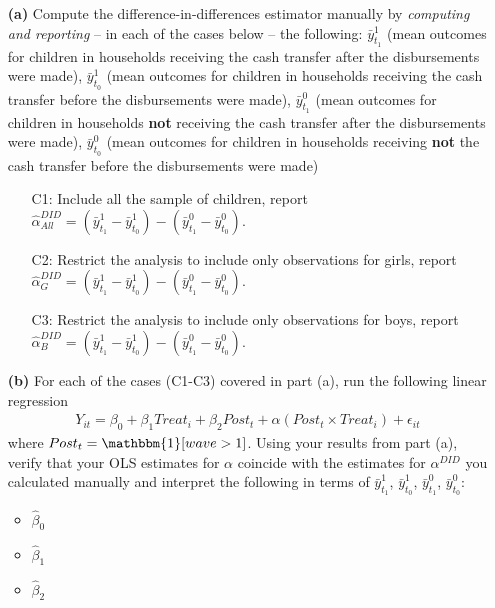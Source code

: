 \documentclass[12pt]{article} %
\begin{document}
\begin{itemize}
	\item[\textbf{(a)}]  Compute the difference-in-differences estimator manually by \textit{computing and reporting} -- in each of the cases below -- the following: $\bar{y}_{t_1}^1$ (mean outcomes for children in households receiving the cash transfer after the disbursements were made),  $\bar{y}_{t_0}^1$ (mean outcomes for children in households receiving the cash transfer before the disbursements were made),  $\bar{y}_{t_1}^0$ (mean outcomes for children in households \textbf{not} receiving the cash transfer after the disbursements were made),  $\bar{y}_{t_0}^0$ (mean outcomes for children in households receiving \textbf{not} the cash transfer before the disbursements were made)
	\begin{enumerate}
		\item[C1:] Include all the sample of children, report $\widehat{\alpha}_{All}^{DID} =( \bar{y}_{t_1}^1 - \bar{y}_{t_0}^1) - ( \bar{y}_{t_1}^0 - \bar{y}_{t_0}^0)$.
				\item[C2:] Restrict the analysis to include only observations for girls, report $\widehat{\alpha}_G^{DID} =( \bar{y}_{t_1}^1 - \bar{y}_{t_0}^1) - ( \bar{y}_{t_1}^0 - \bar{y}_{t_0}^0)$.
						\item[C3:] Restrict the analysis to include only observations for boys, report $\widehat{\alpha}_B^{DID} =( \bar{y}_{t_1}^1 - \bar{y}_{t_0}^1) - ( \bar{y}_{t_1}^0 - \bar{y}_{t_0}^0)$.
	\end{enumerate}
	
	\item[\textbf{(b)}] For each of the cases (C1-C3) covered in part (a), run the following linear regression
	\begin{align}
		Y_{it} = \beta_0 + \beta_1 Treat_i + \beta_2 Post_t + \alpha (Post_t \times Treat_i) + \epsilon_{it}
	\end{align}
where $Post_t = \mathbbm{1}[wave>1]$. Using your results from part (a), verify that your OLS estimates for $\alpha$ coincide with the estimates for $\alpha^{DID}$ you calculated manually and interpret the following in terms of $\bar{y}_{t_1}^1$,  $\bar{y}_{t_0}^1$, $\bar{y}_{t_1}^0$, $\bar{y}_{t_0}^0$:
\begin{itemize}
	\item $\widehat{\beta}_0$
	\item $\widehat{\beta}_1$  
	\item $\widehat{\beta}_2$ 	
	\end{itemize}



\end{itemize}
\end{document}
